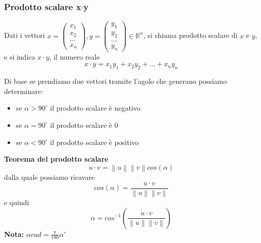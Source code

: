 \documentclass[../main.tex]{subfiles}
\begin{document}
\subsubsection{Prodotto scalare x$\cdot$y}
Dati i vettori $x = \begin{pmatrix}x_1 \\ x_2 \\ ... \\ x_n \end{pmatrix}, y = \begin{pmatrix}y_1 \\ y_2 \\ ... \\ y_n \end{pmatrix} \in \mathbb{R}^n$,
si chiama prodotto scalare di $x$ e $y$, e si indica $x \cdot y$, il numero reale
$$
    x \cdot y = x_1y_1 + x_2y_2 + ... + x_ny_n
$$

Di base se prendiamo due vettori tramite l'agolo che generano possiamo determinare:
\begin{itemize}
    \item se $\alpha > 90^{\circ}$ il prodotto scalare è negativo
    \item se $\alpha = 90^{\circ}$ il prodotto scalare è $0$
    \item se $\alpha < 90^{\circ}$ il prodotto scalare è positivo
\end{itemize}

\vspace{1cm}
\textbf{Teorema del prodotto scalare}
$$
   u \cdot v = \left\lVert u \right\rVert \left\lVert v \right\rVert cos(\alpha)
$$
dalla quale possiamo ricavare
$$
    cos(\alpha) = \frac{u \cdot v}{\left\lVert u\right\rVert \left\lVert v\right\rVert }
$$
e quindi
$$
    \alpha = cos^{-1}\left( \frac{u \cdot v}{\left\lVert u \right\rVert \left\lVert v \right\rVert } \right)
$$
\textbf{Nota:} $\alpha rad = \frac{\pi}{180} \alpha^\circ $
\end{document}
